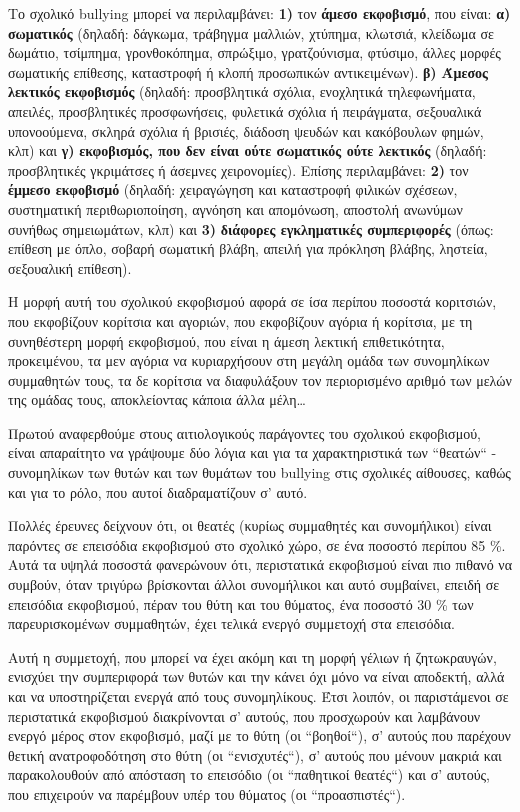 \documentclass[12pt,a4paper,oneside]{book}
\begin{document}
\indent Το σχολικό bullying μπορεί να περιλαμβάνει: \textbf{1)} τον
\textbf{άμεσο εκφοβισμό}, που είναι: \textbf{α)} \textbf{σωματικός} (δηλαδή: δάγκωμα, τράβηγμα μαλλιών, χτύπημα, κλωτσιά, κλείδωμα σε δωμάτιο,
τσίμπημα, γρονθοκόπημα, σπρώξιμο, γρατζούνισμα, φτύσιμο, άλλες μορφές σωματικής
επίθεσης, καταστροφή ή κλοπή προσωπικών αντικειμένων). \textbf{β)}
\textbf{Άμεσος λεκτικός εκφοβισμός} (δηλαδή: προσβλητικά σχόλια, ενοχλητικά
τηλεφωνήματα, απειλές, προσβλητικές προσφωνήσεις, φυλετικά σχόλια ή πειράγματα, σεξουαλικά
υπονοούμενα, σκληρά σχόλια ή βρισιές, διάδοση ψευδών και κακόβουλων φημών,
κλπ) και \textbf{γ)} \textbf{εκφοβισμός, που δεν είναι ούτε σωματικός ούτε
λεκτικός} (δηλαδή: προσβλητικές γκριμάτσες ή άσεμνες χειρονομίες). Επίσης
περιλαμβάνει: \textbf{2)} τον \textbf{έμμεσο εκφοβισμό} (δηλαδή: χειραγώγηση και
καταστροφή φιλικών σχέσεων, συστηματική περιθωριοποίηση, αγνόηση και απομόνωση, αποστολή ανωνύμων
συνήθως σημειωμάτων, κλπ) και \textbf{3)} \textbf{διάφορες εγκληματικές
συμπεριφορές} (όπως: επίθεση με όπλο, σοβαρή σωματική βλάβη, απειλή για πρόκληση βλάβης,
ληστεία, σεξουαλική επίθεση).

\indent Η μορφή αυτή του σχολικού εκφοβισμού αφορά σε ίσα περίπου ποσοστά
κοριτσιών, που εκφοβίζουν κορίτσια και αγοριών, που εκφοβίζουν αγόρια ή κορίτσια, με τη συνηθέστερη μορφή εκφοβισμού, που είναι η
άμεση λεκτική επιθετικότητα, προκειμένου, τα μεν αγόρια να κυριαρχήσουν στη
μεγάλη ομάδα των συνομηλίκων συμμαθητών τους, τα δε κορίτσια να διαφυλάξουν
τον περιορισμένο αριθμό των μελών της ομάδας τους,  αποκλείοντας κάποια άλλα
μέλη\ldots

\indent Πρωτού αναφερθούμε στους αιτιολογικούς παράγοντες του σχολικού
εκφοβισμού, είναι απαραίτητο να γράψουμε δύο λόγια και για τα χαρακτηριστικά των ``θεατών`` - συνομηλίκων των θυτών και
των θυμάτων του bullying στις σχολικές αίθουσες, καθώς και για το ρόλο, που
αυτοί διαδραματίζουν σ' αυτό.

\indent Πολλές έρευνες δείχνουν ότι, οι θεατές (κυρίως συμμαθητές και
συνομήλικοι) είναι παρόντες σε επεισόδια εκφοβισμού στο σχολικό χώρο, σε ένα ποσοστό περίπου \num{85} \%. Αυτά τα υψηλά ποσοστά φανερώνουν ότι, περιστατικά εκφοβισμού είναι πιο πιθανό να συμβούν, όταν τριγύρω βρίσκονται άλλοι συνομήλικοι  και αυτό συμβαίνει, επειδή σε επεισόδια εκφοβισμού, πέραν του
θύτη και του θύματος, ένα ποσοστό \num{30} \% των παρευρισκομένων συμμαθητών,
έχει τελικά ενεργό συμμετοχή στα επεισόδια.

\indent Αυτή η συμμετοχή, που μπορεί να έχει ακόμη και τη μορφή γέλιων ή
ζητωκραυγών, ενισχύει την συμπεριφορά των θυτών και την κάνει όχι μόνο να είναι αποδεκτή, αλλά και να υποστηρίζεται ενεργά από τους συνομηλίκους. Έτσι λοιπόν, οι παριστάμενοι σε περιστατικά εκφοβισμού διακρίνονται σ' αυτούς, που προσχωρούν και λαμβάνουν ενεργό μέρος στον εκφοβισμό, μαζί με το θύτη (οι ``βοηθοί``), σ' αυτούς που παρέχουν θετική
ανατροφοδότηση στο θύτη (οι ``ενισχυτές``), σ' αυτούς που μένουν μακριά και
παρακολουθούν από απόσταση το επεισόδιο (οι ``παθητικοί θεατές``) και σ' αυτούς,
που επιχειρούν να παρέμβουν υπέρ του θύματος (οι ``προασπιστές``).
\end{document}
